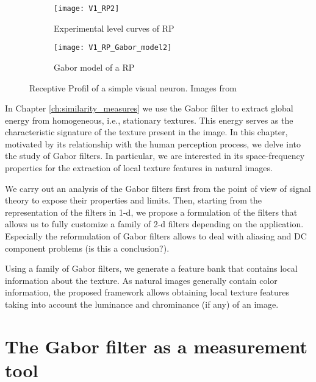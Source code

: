 \begin{figure}[!ht] 
	\centering
	\begin{subfigure}[b]{0.4\textwidth}
		\centering
		\texttt{[image: V1\_RP2]}
		\caption{Experimental level curves of RP}	
		\label{fig:V1_RP}
	\end{subfigure}
	\qquad %
	\begin{subfigure}[b]{0.4\textwidth}
		\centering
		\texttt{[image: V1\_RP\_Gabor\_model2]}
		\caption{Gabor model of a RP }	
		\label{fig:V1_RP_Gabor}
	\end{subfigure}

  \caption{Receptive Profil of a simple visual neuron. Images from \citep{Petitot:Neurogeometrie:2008}}
  \label{fig:simple_neuron_receptive_profil}
\end{figure}

In Chapter \ref{ch:similarity_measures} we use the Gabor filter to extract global energy from homogeneous, i.e., stationary textures. This energy serves as the characteristic signature of the texture present in the image. In this chapter, motivated by its relationship with the human perception process, we delve into the study of Gabor filters. In particular, we are interested in its space-frequency properties for the extraction of local texture features in natural images.

We carry out an analysis of the Gabor filters first from the point of view of signal theory to expose their properties and limits. Then, starting from the representation of the filters in 1-d, we propose a formulation of the filters that allows us to fully customize a family of 2-d filters depending on the application. Especially the reformulation of Gabor filters allows to deal with aliasing and DC component problems (is this a conclusion?).

Using a family of Gabor filters, we generate a feature bank that contains local information about the texture. As natural images generally contain color information, the proposed framework allows obtaining local texture features taking into account the luminance and chrominance (if any) of an image.

\section{The Gabor filter as a measurement tool}\label{ch:gabor_filter_description}

